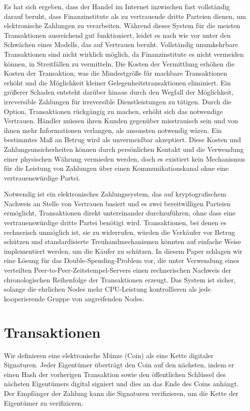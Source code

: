 \documentclass[9pt]{article}
\begin{document}
	Es hat sich ergeben, dass der Handel im Internet inzwischen fast vollständig darauf beruht, dass Finanzinstitute als zu vertrauende dritte Parteien dienen, um elektronische Zahlungen zu verarbeiten. Während dieses System für die meisten Transaktionen ausreichend gut funktioniert, leidet es nach wie vor unter den Schwächen eines Modells, das auf Vertrauen beruht. Vollständig unumkehrbare Transaktionen sind nicht wirklich möglich, da Finanzinstitute es nicht vermeiden können, in Streitfällen zu vermitteln. Die Kosten der Vermittlung erhöhen die Kosten der Transaktion, was die Mindestgröße für machbare Transaktionen erhöht und die Möglichkeit kleiner Gelegenheitstransaktionen eliminiert. Ein größerer Schaden entsteht darüber hinaus durch den Wegfall der Möglichkeit, irreversible Zahlungen für irreversible Dienstleistungen zu tätigen. Durch die Option, Transaktionen rückgängig zu machen, erhöht sich das notwendige Vertrauen. Händler müssen ihren Kunden gegenüber misstrauisch sein und von ihnen mehr Informationen verlangen, als ansonsten notwendig wären. Ein bestimmtes Maß an Betrug wird als unvermeidbar akzeptiert. Diese Kosten und Zahlungsunsicherheiten können durch persönlichen Kontakt und die Verwendung einer physischen Währung vermieden werden, doch es existiert kein Mechanismus für die Leistung von Zahlungen über einen Kommunikationskanal ohne eine vertrauenswürdige Partei.

	Notwendig ist ein elektronisches Zahlungssystem, das auf kryptografischem Nachweis an Stelle von Vertrauen basiert und es zwei bereitwilligen Parteien ermöglicht, Transaktionen direkt untereinander durchzuführen, ohne dass eine vertrauenswürdige dritte Partei benötigt wird. Transaktionen, bei denen es rechnerisch unmöglich ist, sie zu widerrufen, würden die Verkäufer vor Betrug schützen und standardisierte Treuhandmechanismen könnten auf einfache Weise implementiert werden, um die Käufer zu schützen. In diesem Paper schlagen wir eine Lösung für das Double-Spending-Problem vor, die unter Verwendung eines verteilten Peer-to-Peer-Zeitstempel-Servers einen rechnerischen Nachweis der chronologischen Reihenfolge der Transaktionen erzeugt. Das System ist sicher, solange die ehrlichen Nodes mehr CPU-Leistung kontrollieren als jede kooperierende Gruppe von angreifenden Nodes.
	
	\newpage
	
	\section{Transaktionen}
	Wir definieren eine elektronische Münze (Coin) als eine Kette digitaler Signaturen. Jeder Eigentümer überträgt den Coin auf den nächsten, indem er einen Hash der vorherigen Transaktion sowie den öffentlichen Schlüssel des nächsten Eigentümers digital signiert und dies an das Ende des Coins anhängt. Der Empfänger der Zahlung kann die Signaturen verifizieren, um die Kette der Eigentümer zu verifizieren.
	
\end{document}
